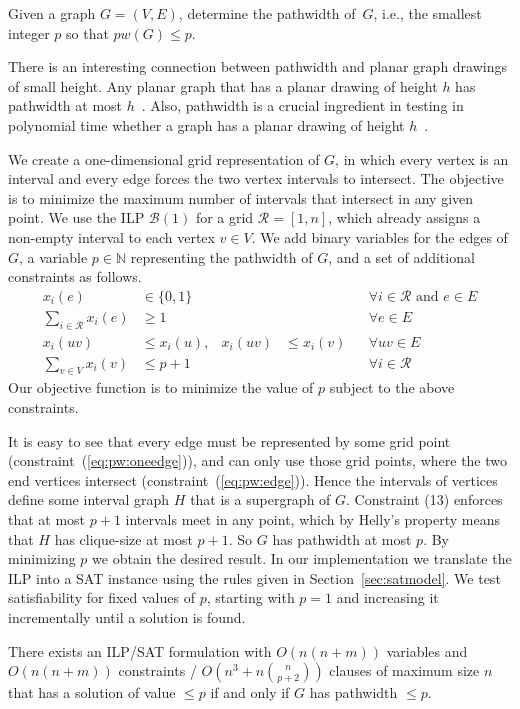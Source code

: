 \documentclass[runningheads]{llncs}
\newcounter{constr}
\begin{document}
\begin{problem}[Pathwidth]\label{pb:pw}
	Given a graph $G=(V,E)$, determine the pathwidth of~$G$, i.e., the smallest integer $p$ so that $pw(G) \le p$.
\end{problem}

There is an interesting connection between pathwidth and planar graph
drawings of small height.  Any planar graph that has a planar
drawing of height $h$ has pathwidth at most $h$~\cite{FLW03}.
Also, pathwidth is a crucial ingredient in
testing in polynomial time whether a graph has a planar drawing of
height $h$~\cite{DFK+08}.

We create a one-dimensional grid representation of $G$, in which every
vertex is an interval and every edge forces the two vertex intervals
to intersect. The objective is to minimize the maximum number of
intervals that intersect in any given point.
We use the ILP $\mathcal B(1)$ for a grid $\mathcal R = [1,n]$, which
already assigns a non-empty interval to each vertex $v \in V$. We add
binary variables for the edges of $G$, a variable $p \in \mathbb N$
representing the pathwidth of $G$, and a set of additional
constraints as follows.
\begin{align}
  \label{eq:pw:edgevar} x_{i}(e) &\in \{0,1\} &&&& \forall {i} \in {\mathcal R} \text{ and } e \in E\\
\label{eq:pw:oneedge} \sum_{i \in \mathcal R} x_{i}(e) &\ge 1 &&&& \forall e \in E\\
  \label{eq:pw:edge} x_i(uv) &\le x_i(u), & x_i(uv) &\le x_i(v) && \forall uv \in E\\
  \label{eq:pw:pw} \sum_{v \in V} x_i(v) &\le p+1 &&&& \forall i \in \mathcal R 
\end{align}
Our objective function is to minimize the value of $p$ subject to the above constraints.

It is easy to see that every edge must be represented by some grid
point (constraint~(\ref{eq:pw:oneedge})), and can only use those grid
points, where the two end vertices intersect
(constraint~(\ref{eq:pw:edge})). Hence the intervals of vertices
define some interval graph $H$ that is a supergraph of $G$. 
Constraint (13) enforces that at most $p+1$ intervals meet in any
point, which by Helly's property means that $H$ has clique-size at
most $p+1$. So $G$ has pathwidth at most $p$. 
By minimizing $p$ we obtain the desired result. 
In our implementation we translate the ILP into a SAT instance
using the rules given in Section~\ref{sec:satmodel}. 
We test satisfiability
for fixed values of $p$, starting with $p=1$ and increasing it
incrementally until a solution is found.
\begin{theorem}
There exists an ILP/SAT formulation with $O(n(n+m))$ variables
and $O(n(n+m))$ constraints / $O(n^3 + n \binom{n}{p+2})$ clauses of
maximum size $n$ that has a solution of value $\leq p$ if and only
if $G$ has pathwidth $\leq p$.
\end{theorem}
\end{document}
